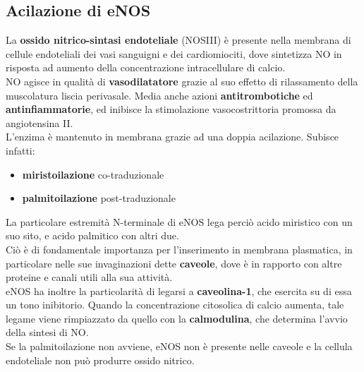 \documentclass[a4paper, 12pt]{article}
\begin{document}
\subsection{Acilazione di eNOS}
La \textbf{ossido nitrico-sintasi endoteliale} (NOSIII) è presente nella membrana di cellule endoteliali dei vasi sanguigni e dei cardiomiociti, dove sintetizza NO in risposta ad aumento della concentrazione intracellulare di calcio.\\
NO agisce in qualità di \textbf{vasodilatatore} grazie al suo effetto di rilassamento della muscolatura liscia perivasale. Media anche azioni \textbf{antitrombotiche} ed \textbf{antinfiammatorie}, ed inibisce la stimolazione vasocostrittoria promossa da angiotensina II.\\
L'enzima è mantenuto in membrana grazie ad una doppia acilazione. Subisce infatti:
\begin{itemize}
\item \textbf{miristoilazione} co-traduzionale
\item \textbf{palmitoilazione} post-traduzionale
\end{itemize}
La particolare estremità N-terminale di eNOS lega perciò acido miristico con un suo sito, e acido palmitico con altri due.\\
Ciò è di fondamentale importanza per l'inserimento in membrana plasmatica, in particolare nelle sue invaginazioni dette \textbf{caveole}, dove è in rapporto con altre proteine e canali utili alla sua attività.\\
eNOS ha inoltre la particolarità di legarsi a \textbf{caveolina-1}, che esercita su di essa un tono inibitorio. Quando la concentrazione citosolica di calcio aumenta, tale legame viene rimpiazzato da quello con la \textbf{calmodulina}, che determina l'avvio della sintesi di NO.\\
Se la palmitoilazione non avviene, eNOS non è presente nelle caveole e la cellula endoteliale non può produrre ossido nitrico.
\end{document}
